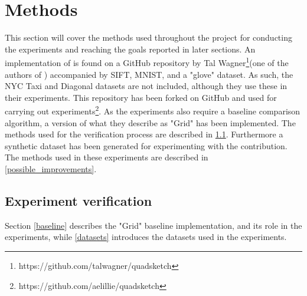 \section{Methods}
\label{methods}
This section will cover the methods used throughout the project for conducting the experiments and reaching the goals reported in later sections. An implementation of \qs{} is found on a GitHub repository by Tal Wagner\footnote{https://github.com/talwagner/quadsketch}(one of the authors of \cite{wagner17}) accompanied by SIFT, MNIST, and a "glove" dataset. As such, the NYC Taxi and Diagonal datasets are not included, although they use these in their experiments. This repository has been forked on GitHub and used for carrying out experiments\footnote{https://github.com/aelillie/quadsketch}. As the experiments also require a baseline comparison algorithm, a version of what they describe as "Grid" has been implemented. The methods used for the verification process are described in \ref{experiment_verification}. Furthermore a synthetic dataset has been generated for experimenting with the \qsr{} contribution. The methods used in these experiments are described in \ref{possible_improvements}.  

\subsection{Experiment verification}
\label{experiment_verification}
Section \ref{baseline} describes the "Grid" baseline implementation, and its role in the experiments, while \ref{datasets} introduces the datasets used in the experiments.

